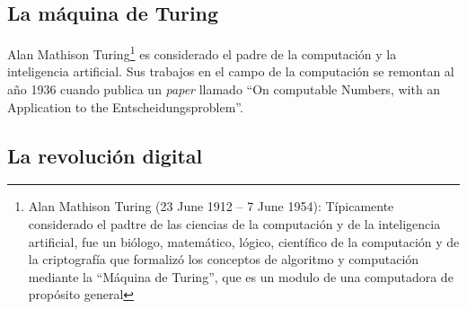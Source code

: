 \subsection{La máquina de Turing}

Alan Mathison Turing\footnote{Alan Mathison Turing (23 June 1912 – 7 June 1954): Típicamente considerado el padtre de las ciencias de la computación y de la inteligencia artificial, fue un biólogo, matemático, lógico, científico de la computación y de la criptografía que formalizó los conceptos de algoritmo y computación mediante la ``Máquina de Turing'', que es un modulo de una computadora de propósito general} es considerado el padre de la computación y la inteligencia artificial. Sus trabajos en el campo de la computación se remontan al año 1936 cuando publica un \emph{paper} llamado ``On computable Numbers, with an Application to the Entscheidungsproblem''.

\subsection{La revolución digital}

